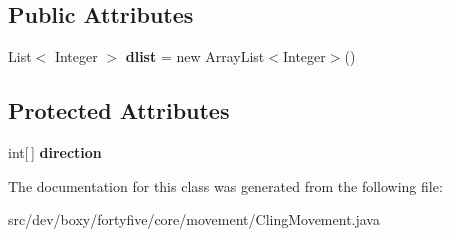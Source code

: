 \subsection*{Public Attributes}
\begin{DoxyCompactItemize}
\item 
\hypertarget{classdev_1_1boxy_1_1fortyfive_1_1core_1_1movement_1_1_cling_movement_a830185632748a30d7ec85de89d647a9b}{
List$<$ Integer $>$ {\bfseries dlist} = new ArrayList$<$Integer$>$()}
\label{d5/dc6/classdev_1_1boxy_1_1fortyfive_1_1core_1_1movement_1_1_cling_movement_a830185632748a30d7ec85de89d647a9b}

\end{DoxyCompactItemize}
\subsection*{Protected Attributes}
\begin{DoxyCompactItemize}
\item 
\hypertarget{classdev_1_1boxy_1_1fortyfive_1_1core_1_1movement_1_1_cling_movement_ad5dd8f313762b3068be43f15bd6d7af2}{
int\mbox{[}$\,$\mbox{]} {\bfseries direction}}
\label{d5/dc6/classdev_1_1boxy_1_1fortyfive_1_1core_1_1movement_1_1_cling_movement_ad5dd8f313762b3068be43f15bd6d7af2}

\end{DoxyCompactItemize}


The documentation for this class was generated from the following file:\begin{DoxyCompactItemize}
\item 
src/dev/boxy/fortyfive/core/movement/ClingMovement.java\end{DoxyCompactItemize}
